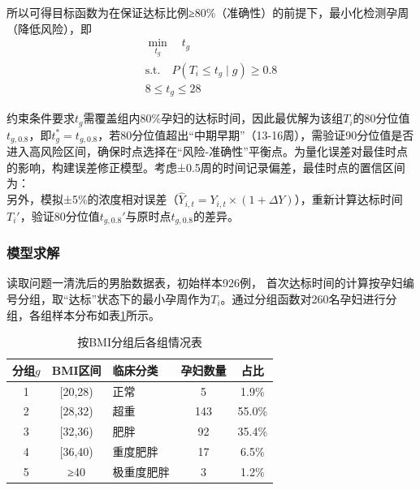 \documentclass[withoutpreface,bwprint]{cumcmthesis} %
\begin{document}
所以可得目标函数为在保证达标比例≥80\%（准确性）的前提下，最小化检测孕周（降低风险），即  
\begin{align}
\min_{t_g} \quad t_g \\
\text{s.t.} \quad P(T_i \leq t_g \mid g) \geq 0.8 \\
8 \leq t_g \leq 28
\end{align}


约束条件要求$t_g$需覆盖组内80\%孕妇的达标时间，因此最优解为该组$T_i$的80分位值$t_{g,0.8}$，即$t_g^* = t_{g,0.8}$，若80分位值超出“中期早期”（13-16周），需验证90分位值是否进入高风险区间，确保时点选择在“风险-准确性”平衡点。为量化误差对最佳时点的影响，构建误差修正模型。考虑±0.5周的时间记录偏差，最佳时点的置信区间为：  
\begin{equation}
[t_g^* - \Delta t, t_g^* + \Delta t]
\end{equation}
另外，模拟±5\%的浓度相对误差（$\hat{Y}_{i,t} = Y_{i,t} \times (1+\Delta Y)$），重新计算达标时间$T_i'$，验证80分位值$t_{g,0.8}'$与原时点$t_{g,0.8}$的差异。  


\subsubsection{模型求解} 
读取问题一清洗后的男胎数据表，初始样本926例，  首次达标时间的计算按孕妇编号分组，取“达标”状态下的最小孕周作为$T_i$。通过分组函数对260名孕妇进行分组，各组样本分布如表\ref{tab:按BMI分组后各组情况表}所示。

\begin{table}[H]
    \centering  %
    \caption{按BMI分组后各组情况表}  %
    \label{tab:按BMI分组后各组情况表}  %
    \begin{threeparttable}
        \begin{tabularx}{0.62\textwidth}{c c l c c }
            \toprule[1.5pt]
            \textbf{分组$g$} & \textbf{BMI区间} & \textbf{临床分类} & \textbf{孕妇数量} & \textbf{占比}\\ 
            \midrule[1pt]
            1       & [20,28)    & 正常       & 5        & 1.9\%   \\
            2       & [28,32)    & 超重       & 143      & 55.0\%  \\
            3       & [32,36)    & 肥胖       & 92       & 35.4\%  \\
            4       & [36,40)    & 重度肥胖   & 17       & 6.5\%   \\
            5       & ≥40        & 极重度肥胖 & 3        & 1.2\%   \\

            \bottomrule[1.5pt]
        \end{tabularx}
    \end{threeparttable}
\end{table}
\end{document}

